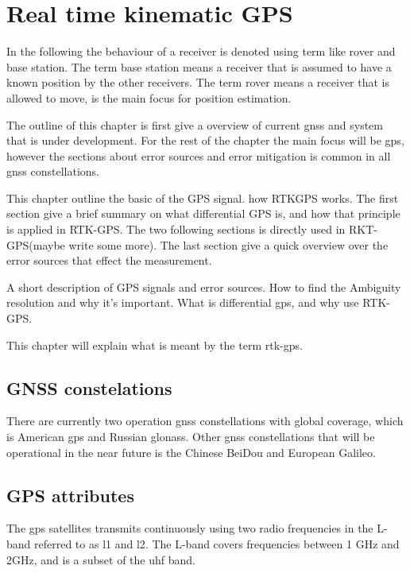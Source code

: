 
\chapter{Real time kinematic GPS}

In the following the behaviour of a receiver is denoted using term like rover and base station. The term base station means a receiver that is assumed to have a known position by the other receivers. The term rover means a receiver that is allowed to move, is the main focus for position estimation.

The outline of this chapter is first give a overview of current \gls{gnss} and system that is under development. For the rest of the chapter the main focus will be \gls{gps}, however the sections about error sources and error mitigation is common in all \gls{gnss} constellations. 



This chapter outline the basic of the GPS signal. how RTKGPS works. The first section give a brief summary on what differential GPS is, and how that principle is applied in RTK-GPS. The two following sections is directly used in RKT-GPS(maybe write some more). The last section give a quick overview over the error sources that effect the measurement.



A short description of GPS signals and error sources. How to find the Ambiguity resolution and why it's important. What is differential gps, and why use RTK-GPS.


This chapter will explain what is meant by the term rtk-gps.



\section{GNSS constelations}
There are currently two operation \gls{gnss} constellations with global coverage, which is American \gls{gps} and Russian \gls{glonass}. Other \gls{gnss} constellations that will be operational in the near future is the Chinese BeiDou and European Galileo.
\section{GPS attributes}
The \gls{gps} satellites transmits continuously using two radio frequencies in the L-band referred to as \gls{l1} and {l2}. The L-band covers frequencies between 1 GHz and 2GHz, and is a subset of the \gls{uhf} band.

